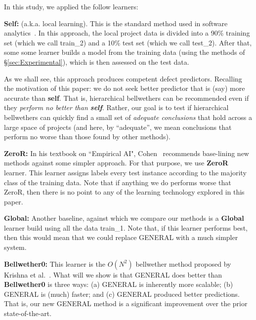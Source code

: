\documentclass[10pt,journal,compsoc]{IEEEtran}
\begin{document}
In this study, we applied the follow learners:

%

\textbf{Self:} (a.k.a. local learning). This  is the standard method used in software analytics~\cite{menzies2013software,zhang2013software}.
In this approach, the local project data is divided into a 90\% training set (which we call  train\_2)
and a 10\% test set (which we call test\_2). After that, some some learner builds a model from the training data
(using the methods of \S\ref{sec:Experimental}),
which is then assessed on the test data.

As we shall see, this approach produces competent defect predictors.
Recalling
the motivation of this paper: we do not
seek   better predictor that is (say) more accurate
than {\bf self}.
That is, hierarchical bellwethers can be recommended even if they {\em 
perform  no better  than {\bf self}}. Rather, our goal is to test if hierarchical bellwethers
can quickly  find a  small set of {\em adequate conclusions}
that hold across a large space 
of projects
(and here, by ``adequate'', we mean conclusions
that perform no worse than those found by other methods).

\textbf{ZeroR:} 
In his textbook on ``Empirical AI", Cohen~\cite{Cohen:1995} recommends base-lining new methods against some simpler approach.
For that purpose, we use {\bf ZeroR} learner. This learner assigns labels every test instance according to
the majority class of the training data. Note that if anything we do performs worse that ZeroR, then there is no
point to any of the learning technology explored in this paper.  

 
\textbf{Global:}  Another baseline, against which we compare our methods
is a {\bf Global} learner build using all the data   train\_1.
Note that, if this learner performs best, then this  would  mean that we could replace GENERAL with a much simpler system.


\textbf{Bellwether0:} This learner is the  $O(N^2)$ bellwether method  proposed by Krishna et al.~\cite{krishna16a}.
What will we show is that GENERAL does better than {\bf Bellwether0} is three ways:
(a) GENERAL is inherently more scalable; (b) GENERAL is (much) faster; and (c) GENERAL produced better predictions.
That is, our new GENERAL method is a significant improvement over the prior state-of-the-art.
\end{document}

